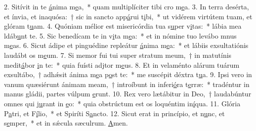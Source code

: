 2. Sitívit in te \uline{á}nima m\uline{e}a,~* quam multiplíciter tibi cro m\uline{e}a.
3. In terra desérta, et ínvia, et inaquósa:~† sic in sancto app\uline{á}rui t\uline{i}bi,~* ut vidérem virtútem tuam, et glóram t\uline{u}am.
4. Quóniam mélior est misericórdia tua s\uline{u}per v\uline{i}tas:~* lábia mea ldáb\uline{u}nt te.
5. Sic benedícam te in v\uline{i}ta m\uline{e}a:~* et in nómine tuo levábo mnus m\uline{e}as.
6. Sicut ádipe et pinguédine repleátur \uline{á}nima m\uline{e}a:~* et lábiis exsultatiónis laudábt os m\uline{e}um.
7. Si memor fui tui super stratum meum,~† in matutínis medit\uline{á}bor \uline{i}n te:~* quia fuísti adjtor m\uline{e}us.
8. Et in velaménto alárum tuárum exsultábo,~† adhǽsit ánima m\uline{e}a p\uline{o}st te:~* me suscépit déxtra t\uline{u}a.
9. Ipsi vero in vanum quæsiérunt ánimam meam,~† introíbunt in inferi\uline{ó}ra t\uline{e}rræ:~* tradéntur in manus gládii, partes vúlpum \uline{e}runt.
10. Rex vero lætábitur in Deo,~† laudabúntur omnes qui j\uline{u}rant in \uline{e}o:~* quia obstrúctum est os loquéntim in\uline{í}qua.
11. Glória P\uline{a}tri, et F\uline{í}lio,~* et Spiríti S\uline{a}ncto.
12. Sicut erat in princípio, et n\uline{u}nc, et s\uline{e}mper,~* et in sǽcula sæculrum. \uline{A}men.
